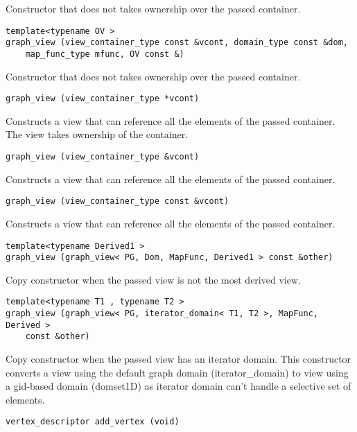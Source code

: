 Constructor that does not takes ownership over the passed container.

\begin{verbatim}
template<typename OV >
graph_view (view_container_type const &vcont, domain_type const &dom,
    map_func_type mfunc, OV const &)
\end{verbatim}

Constructor that does not takes ownership over the passed container.

\begin{verbatim}
graph_view (view_container_type *vcont)
\end{verbatim}

Constructs a view that can reference all the elements of the passed container. The view takes ownership of the container.

\begin{verbatim}
graph_view (view_container_type &vcont)
\end{verbatim}

Constructs a view that can reference all the elements of the passed container.

\begin{verbatim}
graph_view (view_container_type const &vcont)
\end{verbatim}

Constructs a view that can reference all the elements of the passed container.

\begin{verbatim}
template<typename Derived1 >
graph_view (graph_view< PG, Dom, MapFunc, Derived1 > const &other)
\end{verbatim}

Copy constructor when the passed view is not the most derived view.

\begin{verbatim}
template<typename T1 , typename T2 >
graph_view (graph_view< PG, iterator_domain< T1, T2 >, MapFunc, Derived >
    const &other)
\end{verbatim}

Copy constructor when the passed view has an iterator domain. This constructor converts a view using the default graph domain (iterator\_domain) to view using a gid-based domain (domset1D) as iterator domain can't handle a selective set of elements.

\begin{verbatim}
vertex_descriptor add_vertex (void)
\end{verbatim}


